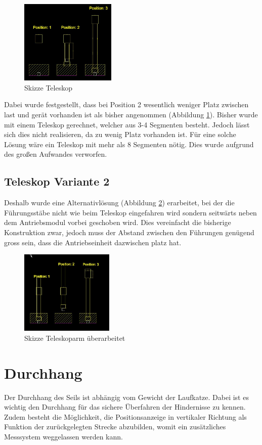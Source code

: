 \documentclass[a4paper]{report}
\begin{document}
\begin{figure}[h]
	\centering
	\includegraphics[keepaspectratio,height=4cm]{Teleskoparm2.JPG}
	\caption{Skizze Teleskop}
	\label{fig:Teleskoparm}
\end{figure}

Dabei wurde festgestellt, dass bei Position 2 wesentlich weniger Platz zwischen last und gerät vorhanden ist als bisher angenommen (Abbildung \ref{fig:Teleskoparm}). Bisher wurde mit einem Teleskop gerechnet, welcher aus 3-4 Segmenten besteht. Jedoch lässt sich dies nicht realisieren, da zu wenig Platz vorhanden ist. Für eine solche Lösung wäre ein Teleskop mit mehr als 8 Segmenten nötig. Dies wurde aufgrund des großen Aufwandes verworfen.

\subsection{Teleskop Variante 2}
\label{app:ssec:Teleskopje2}
Deshalb wurde eine Alternativlösung (Abbildung \ref{fig:Linearaufzug}) erarbeitet, bei der die Führungsstäbe nicht wie beim Teleskop eingefahren wird sondern seitwärts neben dem Antriebsmodul vorbei geschoben wird. Dies vereinfacht die bisherige Konstruktion zwar, jedoch muss der Abstand zwischen den Führungen genügend gross sein, dass die Antriebseinheit dazwischen platz hat.

\begin{figure}[h]
	\centering
	\includegraphics[keepaspectratio,height=4cm]{Teleskoparm3.JPG}
	\caption{Skizze Teleskoparm überarbeitet}
	\label{fig:Linearaufzug}
\end{figure}


\section{Durchhang}
\label{app:sec:Durchhang}
Der Durchhang des Seils ist abhängig vom Gewicht der Laufkatze. Dabei ist es wichtig den Durchhang für das sichere Überfahren der Hindernisse zu kennen. Zudem besteht die Möglichkeit, die Positionsanzeige in vertikaler Richtung als Funktion der zurückgelegten Strecke abzubilden, womit ein zusätzliches Messsystem weggelassen werden kann.
\end{document}
